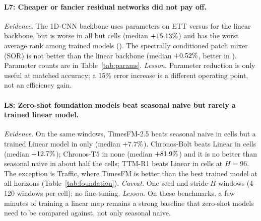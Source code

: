 \documentclass[11pt,a4paper]{article}
\newcommand{\lrn}[1]{\textbf{L#1}}
\begin{document}
\paragraph{\lrn{7}: Cheaper or fancier residual networks did not pay off.}
\emph{Evidence.} The 1D-CNN backbone uses \cnnParamsETT{} parameters on ETT versus \linParamsETT{} for the linear backbone, but is worse in all but \cmpCycCNNCIvsCycLinCIwins{} cells (median $+15.13\%$) and has the worst average rank among trained models (\rankCycCNNCI). The spectrally conditioned patch mixer (SOR) is not better than the linear backbone (median $+0.52\%$, better in \cmpCycSORCIvsCycLinCIwins{}). Parameter counts are in Table~\ref{tab:params}.
\emph{Lesson.} Parameter reduction is only useful at matched accuracy; a 15\% error increase is a different operating point, not an efficiency gain.

\begin{table}[t]
\centering
\caption{Zero-shot foundation models against trained models on identical non-overlapping test windows (seed 2024, MSE averaged over horizons). Bold/underline: best/second among the listed models. $^\dagger$Best trained model chosen per cell after the fact (optimistic reference). TTM-R1 was run only at $H{=}96$ and is discussed in the text.}
\label{tab:foundation}
\resizebox{\textwidth}{!}{}
\end{table}

\paragraph{\lrn{8}: Zero-shot foundation models beat seasonal naive but rarely a trained linear model.}
\emph{Evidence.} On the same windows, TimesFM-2.5 beats seasonal naive in \fmTimesFMTwoFiveVsSnWins{} cells but a trained Linear model in only \fmTimesFMTwoFiveVsLinWins{} (median $+7.7\%$). Chronos-Bolt beats Linear in \fmChronosBoltVsLinWins{} cells (median $+12.7\%$); Chronos-T5 in none (median $+81.9\%$) and it is no better than seasonal naive in about half the cells; TTM-R1 beats Linear in \ttmVsLinWins{} cells at $H{=}96$. The exception is Traffic, where TimesFM is better than the best trained model at all \timesfmTrafficWins{} horizons (Table~\ref{tab:foundation}).
\emph{Caveat.} One seed and stride-$H$ windows (4--120 windows per cell); no fine-tuning.
\emph{Lesson.} On these benchmarks, a few minutes of training a linear map remains a strong baseline that zero-shot models need to be compared against, not only seasonal naive.
\end{document}
